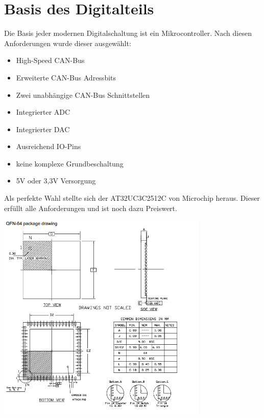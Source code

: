 \documentclass[paper=a4, 12pt]{scrreprt}
\begin{document}
	\section{Basis des Digitalteils}
	Die Basis jeder modernen Digitalschaltung ist ein Mikrocontroller.\hfill \break\break
	Nach diesen Anforderungen wurde dieser ausgewählt:
	\hfill \break 
	\begin{center}
	\begin{minipage}{0.5\textwidth}
	\begin{itemize}
		\item High-Speed CAN-Bus
		\item Erweiterte CAN-Bus Adressbits
		\item Zwei unabhängige CAN-Bus Schnittstellen
		\item Integrierter ADC
		\item Integrierter DAC
		\item Ausreichend IO-Pins
		\item keine komplexe Grundbeschaltung
		\item 5V oder 3,3V Versorgung
	\end{itemize}
	\end{minipage}
	\end{center}
	\hfill \break
	Als perfekte Wahl stellte sich der AT32UC3C2512C von Microchip heraus. Dieser erfüllt alle Anforderungen und ist noch dazu Preiswert.
	\hfill \break
	\begin{adjustbox}{center,caption={AT32UC3C2512C im QFN-64 Package},label={fig:uC Package},nofloat=figure,vspace=\bigskipamount}
		\includegraphics[height=10cm]{img/AT32UC3C2512C.png}
		\hfill \break
	\end{adjustbox}
	\pagebreak
		
\end{document}
